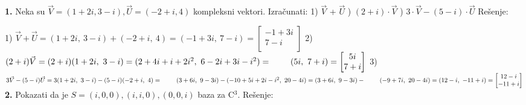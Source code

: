 \documentclass{article}
\begin{document}
\vspace{0.6cm}\newline
\textbf{1.} Neka su $\vec{V} = (1+2i, 3-i), \vec{U} = (-2+i, 4) $ kompleksni vektori. Izračunati: 
1) $\vec{V}$ + $\vec{U}$ ) $(2+i) \cdot \vec{V}$ ) $3 \cdot \vec{V} - (5-i)\cdot \vec{U}$
\vspace*{0.4cm}\newline
Rešenje: \newline

1) $\vec{V} + \vec{U} = (1+2i,\ 3-i) + (-2+i,\ 4) = (-1+3i,\ 7-i) = 
\begin{bmatrix}
    -1+3i \\
    7-i \\
\end{bmatrix}
$
\newline
\hspace*{0.5cm}2) $(2+i)\vec{V} = (2+i)(1+2i,\ 3-i) = (2+4i+i+2i^2,\ 6-2i+3i-i^2) = \newline \hspace*{0.8cm}(5i,\ 7+i) = 
\begin{bmatrix}
    5i \\
    7+i \\
\end{bmatrix}$
\newline
\hspace*{0.5cm}3) $3\vec{V} - (5-i)\vec{U} = 3(1+2i,\ 3-i) - (5-i)(-2+i,\ 4)= \newline \hspace*{0.8cm}(3+6i,\ 9-3i) - (-10+5i+2i-i^2,\ 20-4i) = (3+6i,\ 9-3i) - \newline \hspace*{0.8cm}(-9+7i,\ 20-4i) = (12-i,\ -11+i) = 
\begin{bmatrix}
    12-i \\
    -11+i \\
\end{bmatrix}
$
\vspace*{0.4cm}\newline
\textbf{2.} Pokazati da je $ S = {(i, 0, 0), (i, i, 0), (0, 0, i)}$ baza za C$^3$.
\vspace{0.3cm}\newline
Rešenje: \newline
\end{document}
